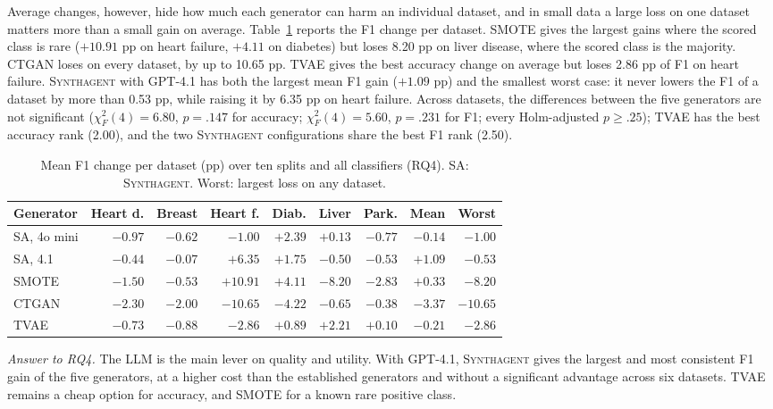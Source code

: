 \documentclass[conference]{IEEEtran}
\newcommand{\system}{\textsc{Synthagent}\xspace}
\newcommand{\best}[1]{\textbf{#1}}
\begin{document}
Average changes, however, hide how much each generator can harm an individual dataset, and in small data a large loss on one dataset matters more than a small gain on average. Table~\ref{tab:robust} reports the F1 change per dataset. SMOTE gives the largest gains where the scored class is rare ($+10.91$ pp on heart failure, $+4.11$ on diabetes) but loses 8.20 pp on liver disease, where the scored class is the majority. CTGAN loses on every dataset, by up to 10.65 pp. TVAE gives the best accuracy change on average but loses 2.86 pp of F1 on heart failure. \system with GPT-4.1 has both the largest mean F1 gain ($+1.09$ pp) and the smallest worst case: it never lowers the F1 of a dataset by more than 0.53 pp, while raising it by 6.35 pp on heart failure. Across datasets, the differences between the five generators are not significant ($\chi^2_F(4)=6.80$, $p=.147$ for accuracy; $\chi^2_F(4)=5.60$, $p=.231$ for F1; every Holm-adjusted $p\ge.25$); TVAE has the best accuracy rank (2.00), and the two \system configurations share the best F1 rank (2.50).

\begin{table}[t]
\centering
\caption{Mean F1 change per dataset (pp) over ten splits and all classifiers (RQ4). \textsc{SA}: \system. Worst: largest loss on any dataset.}
\label{tab:robust}
\scriptsize
\setlength{\tabcolsep}{1pt}
\begin{tabular*}{\columnwidth}{@{\extracolsep{\fill}}lrrrrrrrr@{}}
\toprule
Generator & Heart d. & Breast & Heart f. & Diab. & Liver & Park. & Mean & Worst \\
\midrule
\textsc{SA}, 4o mini & $-0.97$ & $-0.62$ & $-1.00$ & $+2.39$ & $+0.13$ & $-0.77$ & $-0.14$ & $-1.00$ \\
\textsc{SA}, 4.1 & $-0.44$ & $-0.07$ & $+6.35$ & $+1.75$ & $-0.50$ & $-0.53$ & \best{$+1.09$} & \best{$-0.53$} \\
SMOTE & $-1.50$ & $-0.53$ & $+10.91$ & $+4.11$ & $-8.20$ & $-2.83$ & $+0.33$ & $-8.20$ \\
CTGAN & $-2.30$ & $-2.00$ & $-10.65$ & $-4.22$ & $-0.65$ & $-0.38$ & $-3.37$ & $-10.65$ \\
TVAE & $-0.73$ & $-0.88$ & $-2.86$ & $+0.89$ & $+2.21$ & $+0.10$ & $-0.21$ & $-2.86$ \\
\bottomrule
\end{tabular*}
\end{table}

\noindent\textit{Answer to RQ4.} The LLM is the main lever on quality and utility. With GPT-4.1, \system gives the largest and most consistent F1 gain of the five generators, at a higher cost than the established generators and without a significant advantage across six datasets. TVAE remains a cheap option for accuracy, and SMOTE for a known rare positive class.
\end{document}
